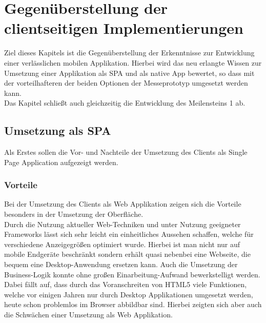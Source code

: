 \chapter{Gegenüberstellung der clientseitigen Implementierungen}
\label{cha:gegenueberstellung}
Ziel dieses Kapitels ist die Gegenüberstellung der Erkenntnisse zur Entwicklung einer verlässlichen mobilen Applikation. Hierbei wird das neu erlangte Wissen zur Umsetzung einer Applikation als \ac{SPA} und als native App bewertet, so dass mit der vorteilhafteren der beiden Optionen der Messeprototyp umgesetzt werden kann. \\
Das Kapitel schließt auch gleichzeitig die Entwicklung des Meilensteins 1 ab.

\section{Umsetzung als SPA}
\label{sec:gegenueberstellung-SPA}
Als Erstes sollen die Vor- und Nachteile der Umsetzung des Clients als Single Page Application aufgezeigt werden.

\subsection{Vorteile}
\label{sec:vorteile-SPA}
Bei der Umsetzung des Clients als Web Applikation zeigen sich die Vorteile besonders in der Umsetzung der Oberfläche. \\
Durch die Nutzung aktueller Web-Techniken und unter Nutzung geeigneter Frameworks lässt sich sehr leicht ein einheitliches Aussehen schaffen, welche für verschiedene Anzeigegrößen optimiert wurde. Hierbei ist man nicht nur auf mobile Endgeräte beschränkt sondern erhält quasi nebenbei eine Webseite, die bequem eine Desktop-Anwendung ersetzen kann. Auch die Umsetzung der Business-Logik konnte ohne großen Einarbeitung-Aufwand bewerkstelligt werden. Dabei fällt auf, dass durch das Voranschreiten von HTML5 viele Funktionen, welche vor einigen Jahren nur durch Desktop Applikationen umgesetzt werden, heute schon problemlos im Browser abbildbar sind. Hierbei zeigten sich aber auch die Schwächen einer Umsetzung als Web Applikation. 

